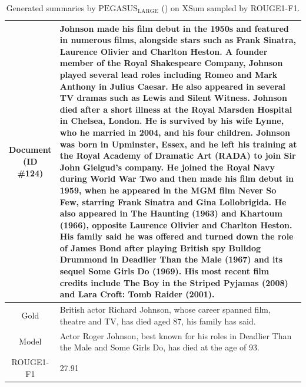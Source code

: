 \begin{table}[bth!]
\begin{tabular}{c|p{}}
\makecell{Document\\(ID \#124)} & 
Johnson made his film debut in the 1950s and featured in numerous films, alongside stars such as Frank Sinatra, Laurence Olivier and Charlton Heston. A founder member of the Royal Shakespeare Company, Johnson played several lead roles including Romeo and Mark Anthony in Julius Caesar. He also appeared in several TV dramas such as Lewis and Silent Witness. Johnson died after a short illness at the Royal Marsden Hospital in Chelsea, London. He is survived by his wife Lynne, who he married in 2004, and his four children. Johnson was born in Upminster, Essex, and he left his training at the Royal Academy of Dramatic Art (RADA) to join Sir John Gielgud's company. He joined the Royal Navy during World War Two and then made his film debut in 1959, when he appeared in the MGM film Never So Few, starring Frank Sinatra and Gina Lollobrigida. He also appeared in The Haunting (1963) and Khartoum (1966), opposite Laurence Olivier and Charlton Heston. His family said he was offered and turned down the role of James Bond after playing British spy Bulldog Drummond in Deadlier Than the Male (1967) and its sequel Some Girls Do (1969). His most recent film credits include The Boy in the Striped Pyjamas (2008) and Lara Croft: Tomb Raider (2001).
\\ \hline
Gold & 
British actor Richard Johnson, whose career spanned film, theatre and TV, has died aged 87, his family has said.
\\ \hline
Model & 
Actor Roger Johnson, best known for his roles in Deadlier Than the Male and Some Girls Do, has died at the age of 93.
\\ \hline
ROUGE1-F1 & 
27.91
\\ \hline
\end{tabular}
\caption{Generated summaries by $\text{PEGASUS}_{\text{LARGE}}$ (\gnews) on XSum sampled by ROUGE1-F1.}
\end{table}
